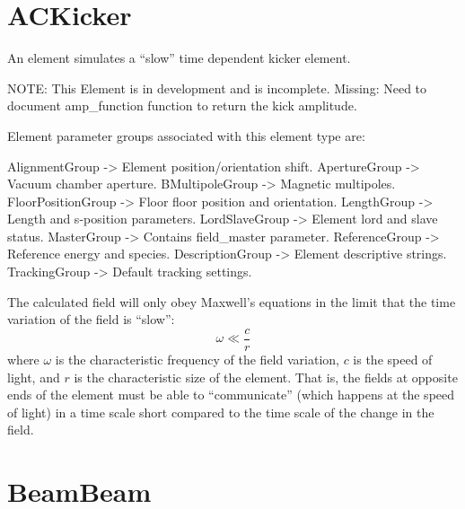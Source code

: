\newpage

\section{ACKicker}
\label{s:ackicker}

An  element simulates a ``slow'' time dependent kicker element.

NOTE: This Element is in development and is incomplete. 
Missing: Need to document amp_function function to return the kick amplitude.

Element parameter groups associated with this element type are:
\TOPrule 
\begin{example}
  AlignmentGroup     -> Element position/orientation shift.  
  ApertureGroup      -> Vacuum chamber aperture.  
  BMultipoleGroup    -> Magnetic multipoles.  
  FloorPositionGroup -> Floor floor position and orientation.  
  LengthGroup        -> Length and s-position parameters.  
  LordSlaveGroup     -> Element lord and slave status.  
  MasterGroup        -> Contains field_master parameter.  
  ReferenceGroup     -> Reference energy and species.  
  DescriptionGroup   -> Element descriptive strings.  
  TrackingGroup      -> Default tracking settings.  
\end{example}
\BOTTOMrule


The calculated field will only obey Maxwell's equations in the limit that the time variation
of the field is ``slow'':
\begin{equation}
  \omega \ll \frac{c}{r}
\end{equation}
where $\omega$ is the characteristic frequency of the field variation, $c$ is the speed of light,
and $r$ is the characteristic size of the  element. That is, the fields at opposite
ends of the element must be able to ``communicate'' (which happens at the speed of light) in a time
scale short compared to the time scale of the change in the field.

\newpage

\section{BeamBeam}
\label{s:beambeam}

